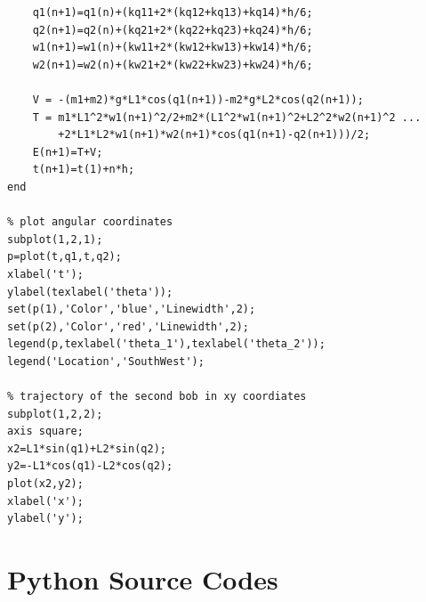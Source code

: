 \begin{verbatim}
    q1(n+1)=q1(n)+(kq11+2*(kq12+kq13)+kq14)*h/6;
    q2(n+1)=q2(n)+(kq21+2*(kq22+kq23)+kq24)*h/6;
    w1(n+1)=w1(n)+(kw11+2*(kw12+kw13)+kw14)*h/6;
    w2(n+1)=w2(n)+(kw21+2*(kw22+kw23)+kw24)*h/6;

    V = -(m1+m2)*g*L1*cos(q1(n+1))-m2*g*L2*cos(q2(n+1));
    T = m1*L1^2*w1(n+1)^2/2+m2*(L1^2*w1(n+1)^2+L2^2*w2(n+1)^2 ...
        +2*L1*L2*w1(n+1)*w2(n+1)*cos(q1(n+1)-q2(n+1)))/2;
    E(n+1)=T+V;
    t(n+1)=t(1)+n*h;
end

% plot angular coordinates
subplot(1,2,1);
p=plot(t,q1,t,q2);
xlabel('t');
ylabel(texlabel('theta'));
set(p(1),'Color','blue','Linewidth',2);
set(p(2),'Color','red','Linewidth',2);
legend(p,texlabel('theta_1'),texlabel('theta_2'));
legend('Location','SouthWest');

% trajectory of the second bob in xy coordiates
subplot(1,2,2);
axis square;
x2=L1*sin(q1)+L2*sin(q2);
y2=-L1*cos(q1)-L2*cos(q2);
plot(x2,y2);
xlabel('x');
ylabel('y');
\end{verbatim}
\normalsize

\section*{Python Source Codes}
\setcounter{program}{0}

